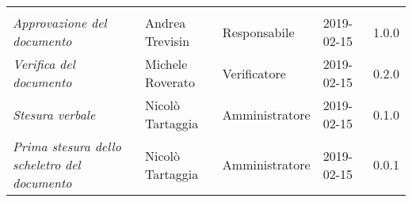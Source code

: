 \newpage 
\section*{}
\begin{table}[H]
	\centering
	\begin{tabular}{p{4cm}|C{3cm}|C{3cm}|R{2.5cm}|R{2cm}}
		
		 & & & & \\
		
		
		\emph{Approvazione del documento} & Andrea Trevisin & Responsabile & 2019-02-15 & 1.0.0 \\
		\hline
		
		\emph{Verifica del documento} & Michele Roverato & Verificatore & 2019-02-15 & 0.2.0 \\
		\hline

		\emph{Stesura verbale} & Nicolò Tartaggia & Amministratore & 2019-02-15 & 0.1.0 \\
		\hline
		
		\emph{Prima stesura dello scheletro del documento} & Nicolò Tartaggia & Amministratore & 2019-02-15 & 0.0.1 \\
		
	\end{tabular}
	
\end{table}


\clearpage